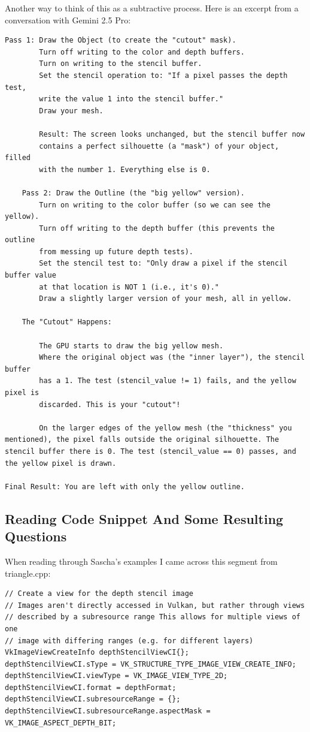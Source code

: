 \documentclass{article}
\begin{document}
\par Another way to think of this as a subtractive process. Here is
an excerpt from a conversation with Gemini 2.5 Pro:
\begin{verbatim}
Pass 1: Draw the Object (to create the "cutout" mask).
        Turn off writing to the color and depth buffers.
        Turn on writing to the stencil buffer.
        Set the stencil operation to: "If a pixel passes the depth test,
        write the value 1 into the stencil buffer."
        Draw your mesh.

        Result: The screen looks unchanged, but the stencil buffer now
        contains a perfect silhouette (a "mask") of your object, filled
        with the number 1. Everything else is 0.

    Pass 2: Draw the Outline (the "big yellow" version).
        Turn on writing to the color buffer (so we can see the yellow).
        Turn off writing to the depth buffer (this prevents the outline
        from messing up future depth tests).
        Set the stencil test to: "Only draw a pixel if the stencil buffer value
        at that location is NOT 1 (i.e., it's 0)."
        Draw a slightly larger version of your mesh, all in yellow.

    The "Cutout" Happens:

        The GPU starts to draw the big yellow mesh.
        Where the original object was (the "inner layer"), the stencil buffer
        has a 1. The test (stencil_value != 1) fails, and the yellow pixel is
        discarded. This is your "cutout"!

        On the larger edges of the yellow mesh (the "thickness" you mentioned), the pixel falls outside the original silhouette. The stencil buffer there is 0. The test (stencil_value == 0) passes, and the yellow pixel is drawn.

Final Result: You are left with only the yellow outline.
\end{verbatim}

\subsection*{Reading Code Snippet And Some Resulting Questions}

\par When reading through Sascha's examples I came across this segment from
triangle.cpp:

\begin{verbatim}
// Create a view for the depth stencil image
// Images aren't directly accessed in Vulkan, but rather through views
// described by a subresource range This allows for multiple views of one
// image with differing ranges (e.g. for different layers)
VkImageViewCreateInfo depthStencilViewCI{};
depthStencilViewCI.sType = VK_STRUCTURE_TYPE_IMAGE_VIEW_CREATE_INFO;
depthStencilViewCI.viewType = VK_IMAGE_VIEW_TYPE_2D;
depthStencilViewCI.format = depthFormat;
depthStencilViewCI.subresourceRange = {};
depthStencilViewCI.subresourceRange.aspectMask = VK_IMAGE_ASPECT_DEPTH_BIT;
\end{verbatim}
\end{document}
